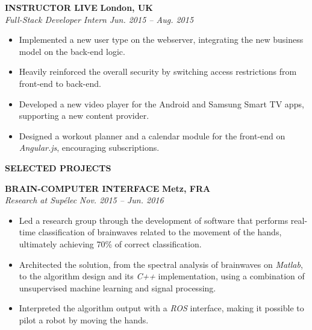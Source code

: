 \documentclass[a4paper, 12pt]{article}
\newcommand{\marginline}{-0.3cm}
\newcommand{\margincontent}{-0.6cm}
\newcommand{\linewidthperso}{0.02cm}
\begin{document}
\begin{footnotesize}
\textbf{INSTRUCTOR LIVE} \hfill \textbf{London, UK}\\
\textit{Full-Stack Developer Intern} \hfill \textit{Jun. 2015 -- Aug. 2015}\\
\vspace{\margincontent}
\begin{itemize}
  \item Implemented a new user type on the webserver, integrating the new business model on the back-end logic.
  \item Heavily reinforced the overall security by switching access restrictions from front-end to back-end.
  \item Developed a new video player for the Android and Samsung Smart TV apps, supporting a new content provider.
  \item Designed a workout planner and a calendar module for the front-end on \textit{Angular.js}, encouraging subscriptions.
\end{itemize}


\textbf{SELECTED PROJECTS}
\vspace{\marginline}\\
\noindent\makebox[\linewidth]{\rule{\textwidth}{\linewidthperso}}
   
\textbf{BRAIN-COMPUTER INTERFACE} \hfill \textbf{Metz, FRA}\\
\textit{Research at Sup\'elec} \hfill \textit{Nov. 2015 -- Jun. 2016}\\
\vspace{\margincontent}
\begin{itemize}
  \item Led a research group through the development of software that performs real-time classification of brainwaves related to the movement of the hands, ultimately achieving 70\% of correct classification.
  \item Architected the solution, from the spectral analysis of brainwaves on \textit{Matlab}, to the algorithm design and its \textit{C++} implementation, using a combination of unsupervised machine learning and signal processing.
  \item Interpreted the algorithm output with a \textit{ROS} interface, making it possible to pilot a robot by moving the hands.
\end{itemize}


\end{footnotesize}
\end{document}
